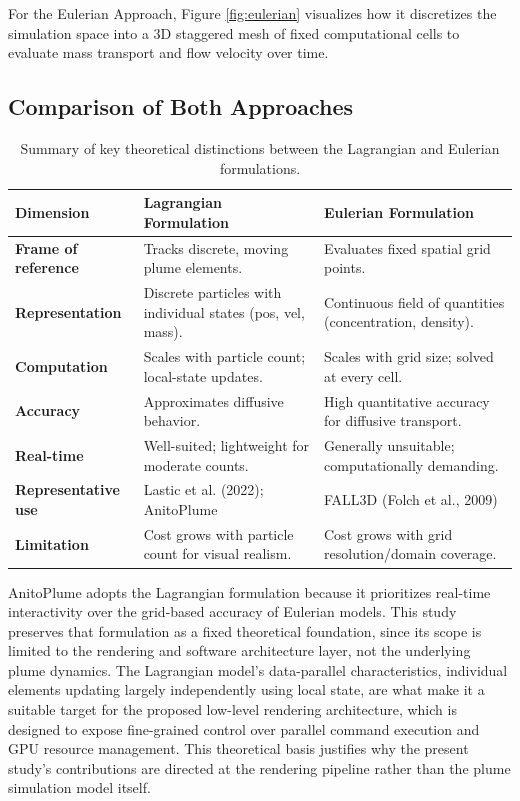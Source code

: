 For the Eulerian Approach, Figure \ref{fig:eulerian} visualizes how it discretizes the simulation space into a 3D staggered mesh of fixed computational cells to evaluate mass transport and flow velocity over time.

\subsection{Comparison of Both Approaches}

\begin{table}[htbp]
\centering
\small
\caption{Summary of key theoretical distinctions between the Lagrangian and Eulerian formulations.}
\label{tab:lagrangian_eulerian_comparison}
\begin{tabular}{l p{5cm} p{5cm}}
\hline
\textbf{Dimension} & \textbf{Lagrangian Formulation} & \textbf{Eulerian Formulation} \\ \hline
\textbf{Frame of reference} & Tracks discrete, moving plume elements. & Evaluates fixed spatial grid points. \\
\textbf{Representation} & Discrete particles with individual states (pos, vel, mass). & Continuous field of quantities (concentration, density). \\
\textbf{Computation} & Scales with particle count; local-state updates. & Scales with grid size; solved at every cell. \\
\textbf{Accuracy} & Approximates diffusive behavior. & High quantitative accuracy for diffusive transport. \\
\textbf{Real-time} & Well-suited; lightweight for moderate counts. & Generally unsuitable; computationally demanding. \\
\textbf{Representative use} & Lastic et al. (2022); AnitoPlume & FALL3D (Folch et al., 2009) \\
\textbf{Limitation} & Cost grows with particle count for visual realism. & Cost grows with grid resolution/domain coverage. \\ \hline
\end{tabular}
\end{table}

AnitoPlume adopts the Lagrangian formulation because it prioritizes real-time interactivity over the grid-based accuracy of Eulerian models. 
This study preserves that formulation as a fixed theoretical foundation, since its scope is limited to the rendering and software architecture layer, not the underlying plume dynamics. 
The Lagrangian model's data-parallel characteristics, individual elements updating largely independently using local state, are what make it a suitable target for the proposed low-level rendering architecture, which is designed to expose fine-grained control over parallel command execution and GPU resource management. 
This theoretical basis justifies why the present study's contributions are directed at the rendering pipeline rather than the plume simulation model itself.

